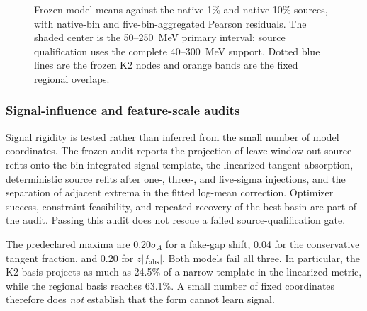 \begin{figure}[htbp]
\centering
{}
\caption{Frozen model means against the native 1\% and native 10\% sources,
with native-bin and five-bin-aggregated Pearson residuals.  The shaded center
is the 50--250~MeV primary interval; source qualification uses the complete
40--300~MeV support.  Dotted blue lines are the frozen K2 nodes and orange
bands are the fixed regional overlaps.}
\label{fig:v4p8p3-source-qualification}
\end{figure}

\subsubsection{Signal-influence and feature-scale audits}

Signal rigidity is tested rather than inferred from the small number of model
coordinates.  The frozen audit reports the projection of leave-window-out
source refits onto the bin-integrated signal template, the linearized tangent
absorption, deterministic source refits after one-, three-, and five-sigma
injections, and the separation of adjacent extrema in the fitted log-mean
correction.  Optimizer success, constraint feasibility, and repeated recovery
of the best basin are part of the audit.  Passing this audit does not rescue a
failed source-qualification gate.

The predeclared maxima are 0.20$\sigma_A$ for a fake-gap shift, 0.04 for the
conservative tangent fraction, and 0.20 for
$z\lvert f_{\mathrm{abs}}\rvert$.  Both models fail all three.  In particular,
the K2 basis projects as much as 24.5\% of a narrow template in the
linearized metric, while the regional basis reaches 63.1\%.  A small number of
fixed coordinates therefore does \emph{not} establish that the form cannot
learn signal.

